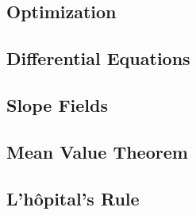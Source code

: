 \documentclass{article}
\begin{document}
\subsection{Optimization}
\subsection{Differential Equations}
\subsection{Slope Fields}\newpage
\subsection{Mean Value Theorem}
\subsection{L'h\^{o}pital's Rule}
\end{document}
